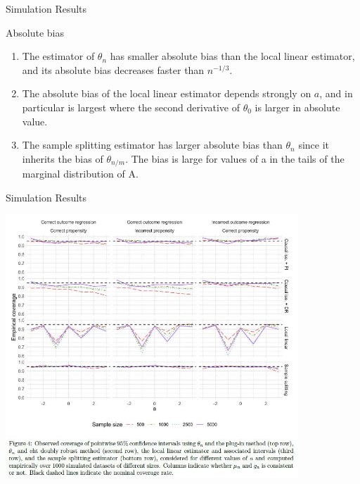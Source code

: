 \documentclass{beamer}
\begin{document}

\begin{frame}{Simulation Results}

\begin{block}{Absolute bias}
	\begin{enumerate}
	\item	The estimator of $\theta_n$ has smaller absolute bias than the local linear estimator, and its absolute bias decreases faster than $n^{-1/3}$.
	\item	The absolute bias of the local linear estimator depends strongly on $a$, and in particular is largest where the second derivative of $\theta_0$ is larger in absolute value.
	\item	The sample splitting estimator has larger absolute bias than $\theta_n$ since it inherits the bias of $\theta_{n/m}$. The bias is large for values of a in the tails of the marginal distribution of A.
	\end{enumerate}
\end{block}

\end{frame}


\begin{frame}{Simulation Results}

\includegraphics[width=11cm]{Causal Isotonic Regression/CIRS504}

\end{frame}

\end{document}
